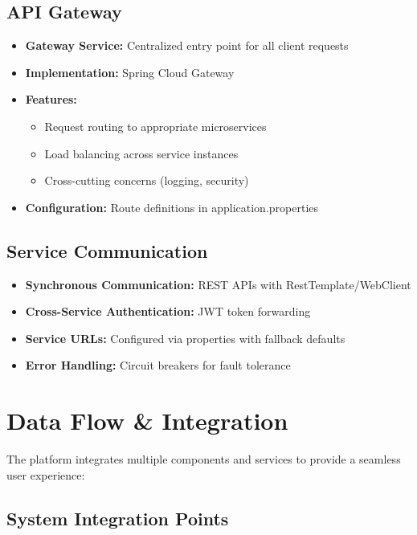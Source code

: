 \documentclass[12pt,a4paper]{report}
\begin{document}
\subsection{API Gateway}

\begin{itemize}
    \item \textbf{Gateway Service:} Centralized entry point for all client requests
    \item \textbf{Implementation:} Spring Cloud Gateway
    \item \textbf{Features:}
    \begin{itemize}
        \item Request routing to appropriate microservices
        \item Load balancing across service instances
        \item Cross-cutting concerns (logging, security)
    \end{itemize}
    \item \textbf{Configuration:} Route definitions in application.properties
\end{itemize}

\subsection{Service Communication}

\begin{itemize}
    \item \textbf{Synchronous Communication:} REST APIs with RestTemplate/WebClient
    \item \textbf{Cross-Service Authentication:} JWT token forwarding
    \item \textbf{Service URLs:} Configured via properties with fallback defaults
    \item \textbf{Error Handling:} Circuit breakers for fault tolerance
\end{itemize}

\section{Data Flow \& Integration}

The platform integrates multiple components and services to provide a seamless user experience:

\subsection{System Integration Points}
\end{document}
